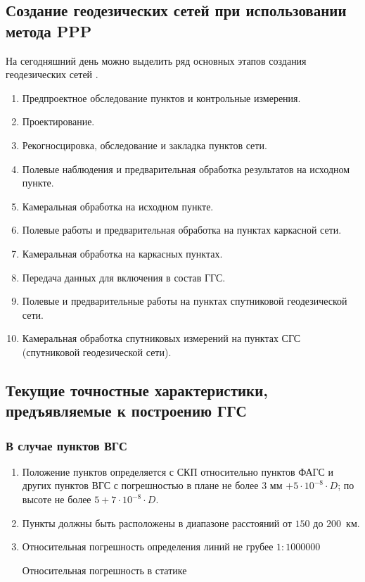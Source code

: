 \subsection{Создание геодезических сетей при использовании метода PPP}

На сегодняшний день можно выделить ряд основных этапов создания геодезических сетей \cite{mak09,src33}.

\begin{enumerate}
	\item	Предпроектное обследование пунктов и контрольные измерения.
	\item	Проектирование.
	\item	Рекогносцировка, обследование и закладка пунктов сети.
	\item	Полевые наблюдения и предварительная обработка результатов на исходном пункте.
	\item	Камеральная обработка на исходном пункте.
	\item	Полевые работы и предварительная обработка на пунктах каркасной сети.
	\item	Камеральная обработка на каркасных пунктах.
	\item	Передача данных для включения в состав ГГС.
	\item	Полевые	и	предварительные	работы	на	пунктах	спутниковой геодезической сети.
	\item	Камеральная обработка спутниковых измерений на пунктах СГС (спутниковой геодезической сети).
\end{enumerate}

\subsection{Текущие точностные характеристики, предъявляемые к построению ГГС}

\subsubsection{В случае пунктов ВГС}

\begin{enumerate}
	\item	Положение пунктов определяется с СКП относительно пунктов ФАГС и других пунктов ВГС с погрешностью в плане не более $3$ мм $+5\cdot10^{-8}\cdot D$; по высоте не более $5+7\cdot 10^{-8}\cdot D$.
	\item	Пункты должны быть расположены в диапазоне расстояний от $150$ до $200$~км.
	\item	Относительная погрешность определения линий не грубее $1:1000000$ 
	
	Относительная погрешность в статике
\end{enumerate}


